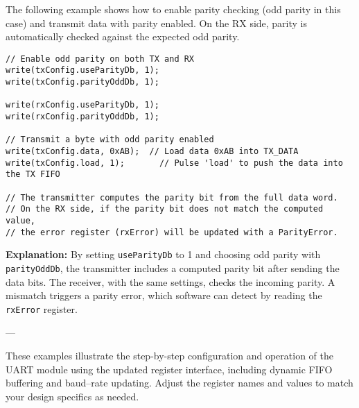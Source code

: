 The following example shows how to enable parity checking (odd parity in this case) and transmit data with parity enabled. On the RX side, parity is automatically checked against the expected odd parity.

\begin{verbatim}
// Enable odd parity on both TX and RX
write(txConfig.useParityDb, 1);
write(txConfig.parityOddDb, 1);

write(rxConfig.useParityDb, 1);
write(rxConfig.parityOddDb, 1);

// Transmit a byte with odd parity enabled
write(txConfig.data, 0xAB);  // Load data 0xAB into TX_DATA
write(txConfig.load, 1);       // Pulse 'load' to push the data into the TX FIFO

// The transmitter computes the parity bit from the full data word.
// On the RX side, if the parity bit does not match the computed value,
// the error register (rxError) will be updated with a ParityError.
\end{verbatim}

\vspace{1em}
\noindent
\textbf{Explanation:}  
By setting \texttt{useParityDb} to 1 and choosing odd parity with \texttt{parityOddDb}, the transmitter includes a computed parity bit after sending the data bits. The receiver, with the same settings, checks the incoming parity. A mismatch triggers a parity error, which software can detect by reading the \texttt{rxError} register.

---

These examples illustrate the step-by-step configuration and operation of the UART module using the updated register interface, including dynamic FIFO buffering and baud–rate updating. Adjust the register names and values to match your design specifics as needed.
